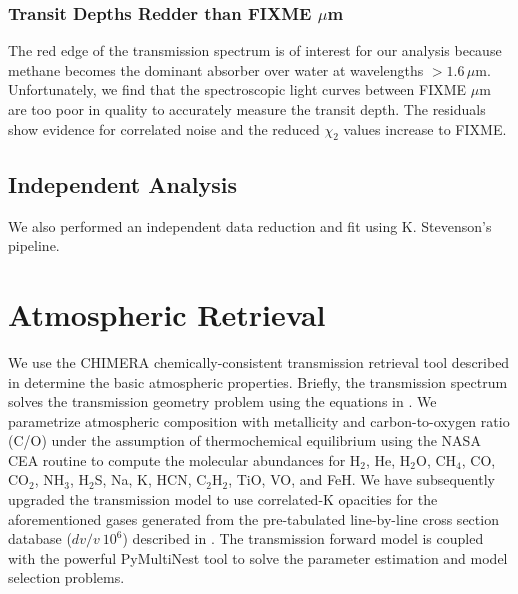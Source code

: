 \documentclass[twocolumn]{aastex61}
\begin{document}
\subsubsection{Transit Depths Redder than FIXME $\mu$m}
The red edge of the transmission spectrum is of interest for our analysis because methane becomes the dominant absorber over water at wavelengths $> 1.6\,\mu$m. Unfortunately, we find that the spectroscopic light curves between FIXME $\mu$m are too poor in quality to accurately measure the transit depth. The residuals show evidence for correlated noise and the reduced $\chi_2$ values increase to FIXME. 

\subsection{Independent Analysis}
We also performed an independent data reduction and fit using K. Stevenson's pipeline.


\section{Atmospheric Retrieval}
We use the CHIMERA chemically-consistent transmission retrieval tool described in \cite{kreidberg15} determine the basic atmospheric properties.   Briefly, the transmission spectrum solves the transmission geometry problem using the equations in \cite{brown11, tinetti12}.  We parametrize atmospheric composition with metallicity and carbon-to-oxygen ratio (C/O) under the assumption of thermochemical equilibrium using the NASA CEA routine \citep{gordon96} to compute the molecular abundances for H$_2$, He, H$_2$O, CH$_4$, CO, CO$_2$, NH$_3$, H$_2$S, Na, K, HCN, C$_2$H$_2$, TiO, VO, and FeH.    We have subsequently upgraded the transmission model to use correlated-K opacities \citep{lacis91, molliere15, amundsen16} for the aforementioned gases generated from the pre-tabulated line-by-line cross section database ($dv/v~10^6$) described in \cite{freedman14}. The transmission forward model is coupled with the powerful PyMultiNest tool \citep{buchner16} to solve the parameter estimation and model selection problems.  
\end{document}
